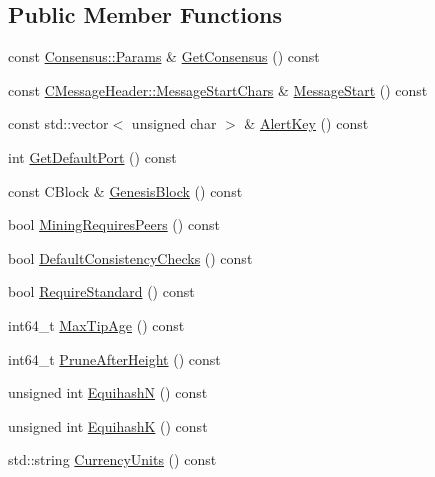 \subsection*{Public Member Functions}
\begin{DoxyCompactItemize}
\item 
const \mbox{\hyperlink{chainparams_8h_a5e1ca1b35c3dd1a4e20f18445f28dd9c}{Consensus\+::\+Params}} \& \mbox{\hyperlink{class_c_chain_params_aa366d4f63c8d16d625336dca61ca65e5}{Get\+Consensus}} () const
\item 
const \mbox{\hyperlink{class_c_message_header_a0d0eeb540cbf4087973f6652ad61878f}{C\+Message\+Header\+::\+Message\+Start\+Chars}} \& \mbox{\hyperlink{class_c_chain_params_a42f81df0a4f3494e3fc83ab53049fdd9}{Message\+Start}} () const
\item 
const std\+::vector$<$ unsigned char $>$ \& \mbox{\hyperlink{class_c_chain_params_a8ca8fe289d1c3d5851d6aebaf28db22f}{Alert\+Key}} () const
\item 
int \mbox{\hyperlink{class_c_chain_params_a2e796bba356e7ce2040f545ea466754f}{Get\+Default\+Port}} () const
\item 
const C\+Block \& \mbox{\hyperlink{class_c_chain_params_aebd6cb9d986eeb2e6c228c04b3c39b42}{Genesis\+Block}} () const
\item 
bool \mbox{\hyperlink{class_c_chain_params_a066ad4166984a31bdc0836193a6341ee}{Mining\+Requires\+Peers}} () const
\item 
bool \mbox{\hyperlink{class_c_chain_params_a1d12f9b4b1ea7d7a0416cb6045496342}{Default\+Consistency\+Checks}} () const
\item 
bool \mbox{\hyperlink{class_c_chain_params_a30c1b60e515537b01810e175844d852f}{Require\+Standard}} () const
\item 
int64\+\_\+t \mbox{\hyperlink{class_c_chain_params_a5d18d7cfb1f2313740d6555da9a707a7}{Max\+Tip\+Age}} () const
\item 
int64\+\_\+t \mbox{\hyperlink{class_c_chain_params_abca14fce5f7e9681a73a13281672a059}{Prune\+After\+Height}} () const
\item 
unsigned int \mbox{\hyperlink{class_c_chain_params_aa6ba38ecceba49d7087d4efb92f01991}{EquihashN}} () const
\item 
unsigned int \mbox{\hyperlink{class_c_chain_params_a0cd2786a2b4f06201b94570ebc863a43}{EquihashK}} () const
\item 
std\+::string \mbox{\hyperlink{class_c_chain_params_a3a925294bd23ce6a3765fdbd768632e4}{Currency\+Units}} () const
\item 

\end{DoxyCompactItemize}
